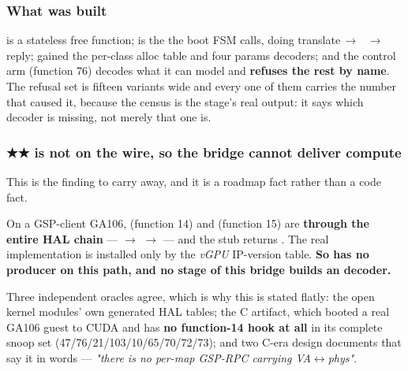 \documentclass[10.5pt]{article}
\begin{document}
\subsubsection*{What was built}

 is a stateless free function; 
is the  the boot FSM calls, doing translate\,$\rightarrow$\,
\,$\rightarrow$\,reply;  gained the per-class alloc table and four params
decoders; and the control arm (function 76) decodes what it can model and \textbf{refuses the rest
by name}. The refusal set is fifteen variants wide and every one of them carries the number that
caused it, because the census is the stage's real output: it says which decoder is missing, not
merely that one is.

\subsubsection*{\texorpdfstring{★★  is not on the wire, so the bridge cannot deliver compute}{MAP\_MEMORY\_DMA is not on the wire, so the bridge cannot deliver compute}}

This is the finding to carry away, and it is a roadmap fact rather than a code fact.

\begin{warnbox}\small
On a GSP-client GA106,  (function 14) and 
(function 15) are \textbf{ through the entire HAL chain} — 
$\rightarrow$  $\rightarrow$  — and the stub returns
. The real implementation is installed only by the \emph{vGPU}
IP-version table. \textbf{So  has no producer on this path, and no
stage of this bridge builds an  decoder.}
\end{warnbox}

Three independent oracles agree, which is why this is stated flatly: the open kernel modules'
own generated HAL tables; the C artifact, which booted a real GA106 guest to CUDA and has
\textbf{no function-14 hook at all} in its complete snoop set (47/76/21/103/10/65/70/72/73); and
two C-era design documents that say it in words — \emph{"there is no per-map GSP-RPC carrying
VA$\leftrightarrow$phys"}.
\end{document}
